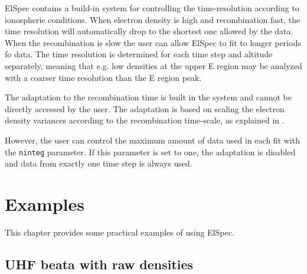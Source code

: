 \documentclass[12pt,a4paper]{report}
\begin{document}
ElSpec contains a build-in system for controlling the time-resolution according to ionospheric conditions. When electron density is high and recombination fast, the time resolution will automatically drop to the shortest one allowed by the data. When the recombination is slow the user can allow ElSpec to fit to longer periods fo data. The time resolution is determined for each time step and altitude separately, meaning that e.g. low densities at the upper E region may be analyzed with a coarser time resolution than the E region peak. 

The adaptation to the recombination time is built in the system and cannot be directly accessed by the user. The adaptation is based on scaling the electron density variances according to the recombination time-scale, as explained in \cite{virtanen2018}. 

However, the user can control the maximum amount of data used in each fit with the \verb|ninteg| parameter. If this parameter is set to one, the adaptation is disabled and data from exactly one time step is always used. 


\chapter{Examples}

This chapter provides some practical examples of using ElSpec. 

\section{UHF beata with raw densities}
\end{document}
